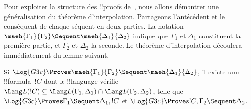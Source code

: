 \documentclass[../../../include/open-logic-section]{subfiles}
\begin{document}
Pour exploiter la structure des !!{proof}s de~, nous allons
démontrer une généralisation du théorème d'interpolation. Partageons
l'antécédent et le conséquent de chaque séquent en deux parties.
La notation $\maeh{\Gamma_1}{\Gamma_2} \Sequent
\maeh{\Delta_1}{\Delta_2}$ indique que $\Gamma_1$ et $\Delta_1$
constituent la première partie, et $\Gamma_2$ et $\Delta_2$ la seconde.
Le théorème d'interpolation découlera immédiatement du lemme suivant.

\begin{lem}
Si $\Log{G3c} \Proves \maeh{\Gamma_1}{\Gamma_2} \Sequent
\maeh{\Delta_1}{\Delta_2}$, il existe une !!{formula}~$!C$ dont le
!!{language} vérifie $\Lang L(!C) \subseteq \Lang L(\Gamma_1,
\Delta_1) \cap \Lang L(\Gamma_2, \Delta_2)$, telle que
$\Log{G3c} \Proves \Gamma_1 \Sequent \Delta_1, !C$ et
$\Log{G3c} \Proves !C, \Gamma_2 \Sequent \Delta_2$.
\end{lem}
\end{document}
